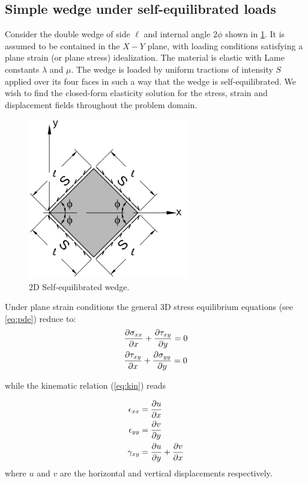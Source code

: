 \subsection*{Simple wedge under self-equilibrated loads}
Consider the double wedge of side $\ell$ and internal angle $2 \phi$ shown in \cref{fig:WEDGE}. It is assumed to be contained in the $X-Y$ plane, with loading conditions satisfying a plane strain (or plane stress) idealization. The material is elastic with Lame constants $\lambda$ and $\mu$. The wedge is loaded by uniform tractions of intensity $S$ applied over its four faces in such a way that the wedge is self-equilibrated. We wish to find the closed-form elasticity solution for the stress, strain and displacement fields throughout the problem domain.
%
\begin{figure}[H]
\centering
\includegraphics[width=7cm]{wedge.pdf}
\caption{2D Self-equilibrated wedge.}
\label{fig:WEDGE}
\end{figure}

Under plane strain conditions the general 3D stress equilibrium equations (see \cref{eq:pde}) reduce to:
\begin{equation}
\begin{aligned}
&\pdv{\sigma_{xx}}{x}+\pdv{\tau_{xy}}{y}=0\\
&\pdv{\tau_{xy}}{x}+\pdv{\sigma_{yy}}{y}=0
\end{aligned}
\label{eq:equilibrium}
\end{equation}

while the kinematic relation (\cref{eq:kin}) reads

\begin{equation}
\begin{aligned}
\epsilon_{xx}&=\pdv{u}{x}\\
\epsilon_{yy}&=\pdv{v}{y}\\
\gamma_{xy}&=\pdv{u}{y} + \pdv{v}{x}
\end{aligned}
\label{eq:strain}
\end{equation}
where $u$ and $v$ are the horizontal and vertical displacements respectively.

